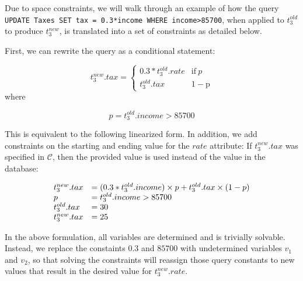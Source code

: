 
Due to space constraints, we will walk through an example of how the query
\texttt{UPDATE Taxes SET tax = 0.3*income WHERE income>85700}, when applied to 
$t_3^{old}$ to produce $t_3^{new}$, is translated into a set of constraints
as detailed below.

First, we can rewrite the query as a conditional statement:

\vspace*{-0.15in}
\[
t_3^{new}.tax = \begin{cases}
				  0.3*t_3^{old}.rate              & \mathrm{if}\ p  \\
                  t_3^{old}.tax  & \mathrm{1-p}
               \end{cases}
\]
\vspace*{-0.1in}
where 
\vspace*{-0.1in}

\[p = t_3^{old}.income > 85700\]

\vspace*{-0.05in}
This is equivalent to the following linearized form.
In addition, we add constraints on the starting and ending value for the $rate$ attribute:
If $t_3^{new}.tax$ was specified in $\mathcal{C}$, then the provided value
is used instead of the value in the database:
\vspace*{-0.1in}

\[
\begin{array}{l l l}
t_3^{new}.tax &= (0.3*t_3^{old}.income)\times p + t_3^{old}.tax\times (1-p)\\
p &= t_3^{old}.income > 85700\\
t_3^{old}.tax &= 30 \\
t_3^{new}.tax &= 25
\end{array}
\]

\vspace*{-0.05in}
In the above formulation, all variables are determined and is trivially
solvable.  Instead, we replace
the constaints $0.3$ and $85700$ with undetermined variables $v_1$ and $v_2$,
so that solving the constraints will reassign those query constants 
to new values that result in the desired value for $t_3^{new}.rate$.  
\iffalse
\[
\begin{array}{l l l}
t_3^{new}.tax &= (v_1*t_3^{old}.income)\times p + t_3^{old}.tax\times (1-p)\\
p              &= t_3^{old}.income > v_2\\
t_3^{old}.tax 30 \\
t_3^{new}.tax &= 25 \\
v_1            &\in [minval, maxval]\\
v_2            &\in [minval, maxval]\\
\end{array}
\]
\fi
